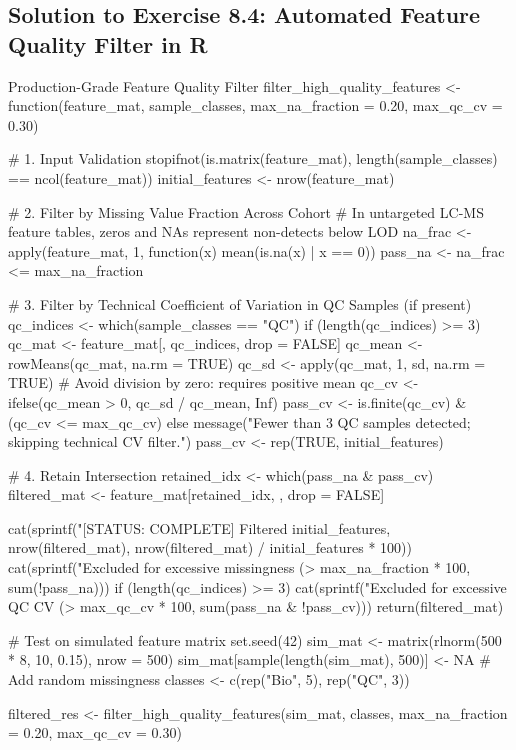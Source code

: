 \documentclass[11pt,twoside,openright]{book}
\begin{document}
\clearpage
\subsection*{Solution to Exercise 8.4: Automated Feature Quality Filter in R}

\begin{rchunk}{Production-Grade Feature Quality Filter}
filter_high_quality_features <- function(feature_mat, sample_classes, 
                                        max_na_fraction = 0.20, max_qc_cv = 0.30) {
  # 1. Input Validation
  stopifnot(is.matrix(feature_mat), length(sample_classes) == ncol(feature_mat))
  initial_features <- nrow(feature_mat)
  
  # 2. Filter by Missing Value Fraction Across Cohort
  # In untargeted LC-MS feature tables, zeros and NAs represent non-detects below LOD
  na_frac <- apply(feature_mat, 1, function(x) mean(is.na(x) | x == 0))
  pass_na <- na_frac <= max_na_fraction
  
  # 3. Filter by Technical Coefficient of Variation in QC Samples (if present)
  qc_indices <- which(sample_classes == "QC")
  if (length(qc_indices) >= 3) {
    qc_mat <- feature_mat[, qc_indices, drop = FALSE]
    qc_mean <- rowMeans(qc_mat, na.rm = TRUE)
    qc_sd   <- apply(qc_mat, 1, sd, na.rm = TRUE)
    # Avoid division by zero: requires positive mean
    qc_cv   <- ifelse(qc_mean > 0, qc_sd / qc_mean, Inf)
    pass_cv <- is.finite(qc_cv) & (qc_cv <= max_qc_cv)
  } else {
    message("Fewer than 3 QC samples detected; skipping technical CV filter.")
    pass_cv <- rep(TRUE, initial_features)
  }
  
  # 4. Retain Intersection
  retained_idx <- which(pass_na & pass_cv)
  filtered_mat <- feature_mat[retained_idx, , drop = FALSE]
  
  cat(sprintf("[STATUS: COMPLETE] Filtered %
              initial_features, nrow(filtered_mat), nrow(filtered_mat) / initial_features * 100))
  cat(sprintf("Excluded for excessive missingness (> %
              max_na_fraction * 100, sum(!pass_na)))
  if (length(qc_indices) >= 3) {
    cat(sprintf("Excluded for excessive QC CV (> %
                max_qc_cv * 100, sum(pass_na & !pass_cv)))
  }
  return(filtered_mat)
}

# Test on simulated feature matrix
set.seed(42)
sim_mat <- matrix(rlnorm(500 * 8, 10, 0.15), nrow = 500)
sim_mat[sample(length(sim_mat), 500)] <- NA # Add random missingness
classes <- c(rep("Bio", 5), rep("QC", 3))

filtered_res <- filter_high_quality_features(sim_mat, classes, max_na_fraction = 0.20, max_qc_cv = 0.30)
\end{rchunk}
\end{document}
